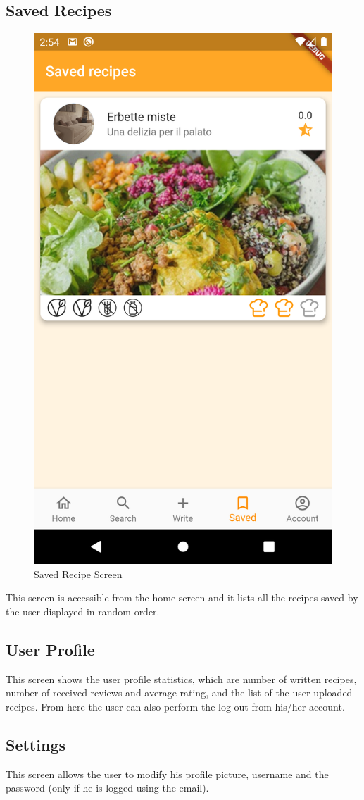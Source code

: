 \subsection{Saved Recipes}
\begin{figure}[H]
	\centering
	\includegraphics[width = .3\linewidth]{img/Saved.png}
	\caption{Saved Recipe Screen}
\end{figure}
This screen is accessible from the home screen and it lists all the recipes saved by the user displayed in random order.

\subsection{User Profile}
This screen shows the user profile statistics, which are number of written recipes, number of received reviews and average rating, and the list of the user uploaded recipes.
From here the user can also perform the log out from his/her account.

\subsection{Settings}
This screen allows the user to modify his profile picture, username and the password (only if he is logged using the email).
